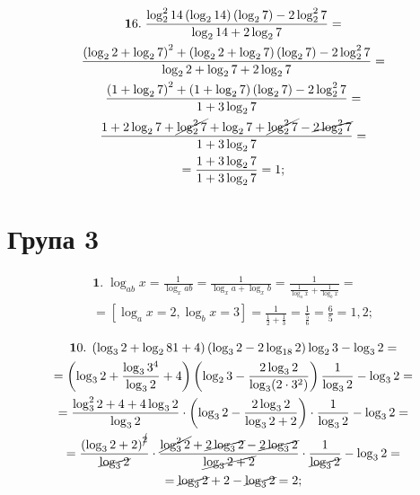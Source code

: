 \begin{multline*}
{\mathbf 16.}\;
\frac{\log_2^2 14 \left(\log_2 14\right)\left(\log_2 7\right) - 2 \log_2^2 7}{\log_2 14 + 2\log_2 7} =\\
\frac{\left(\log_2 2 + \log_2 7\right)^2 + \left(\log_2 2 + \log_2 7\right)\left(\log_2 7\right) - 2\log_2^2 7}{\log_2 2 + \log_2 7 + 2\log_2 7} =\\
\frac{\left(1 + \log_2 7\right)^2 + \left(1 + \log_2 7\right)\left(\log_2 7\right) - 2\log_2^2 7}{1 + 3\log_2 7} =\\
\frac{1 + 2\log_2 7 + \cancel{\log_2^2 7} +\log_2 7 + \cancel{\log_2^2 7}- \cancel{2\log_2^2 7}}{1 + 3\log_2 7} =\\
= \frac{1 + 3\log_2 7}{1 + 3\log_2 7} = 1;
\end{multline*}
\section*{Група 3}

\begin{multline*}
{\mathbf 1.}\;
\log_{ab} x = \frac{1}{\log_x ab} = \frac{1}{\log_x a + \log_x b} = \frac{1}{\frac{1}{\log_a x} + \frac{1}{\log_b x}} =\\
= \left[\log_a x = 2, \log_b x = 3\right] = \frac{1}{\frac{1}{2} + \frac{1}{3}} = \frac{1}{\frac{5}{6}} = \frac{6}{5} = 1,2;
\end{multline*}

\begin{multline*}
{\mathbf 10.}\;
\left(\log_3 2 + \log_2 81 + 4\right)\left(\log_3 2 - 2\log_{18} 2\right)\log_2 3 - \log_3 2 =\\
= \left(\log_3 2 + \frac{\log_3 3^4}{\log_3 2} + 4\right)\left(\log_2 3 - \frac{2\log_3 2}{\log_3 (2 \cdot 3^2)}\right)\frac{1}{\log_3 2} - \log_3 2 =\\
= \frac{\log_3^2 2 + 4 + 4\log_3 2}{\log_3 2} \cdot \left(\log_3 2 - \frac{2\log_3 2}{\log_3 2 + 2}\right) \cdot \frac{1}{\log_3 2} - \log_3 2 =\\
= \frac{\left(\log_3 2 + 2\right)^{\cancel{2}}}{\cancel{\log_3 2}} \cdot \frac{\cancel{\log_3^2 2} + \cancel{2\log_3 2} - \cancel{2\log_3 2}}{\cancel{\log_3 2 + 2}} \cdot \frac{1}{\cancel{\log_3 2}} - \log_3 2 =\\
= \cancel{\log_3 2} + 2 - \cancel{\log_3 2} = 2;
\end{multline*}